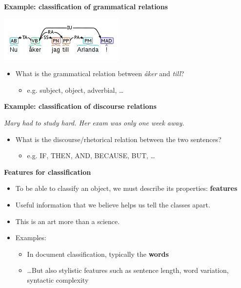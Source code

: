 \documentclass{beamer}
\newcommand{\remph}[1]{\textbf{\color{red} #1}}
\newcommand{\pagestepalt}[2]{
  \begin{frame}[t]
    \begin{minipage}[t][0.26\textheight][t]{\textwidth}
      \begin{center}
        \huge
        \textbf{#1}
      \end{center}
    \end{minipage}
    
    \begin{minipage}[t][0.7\textheight][c]{\textwidth}
      #2
    \end{minipage}
  \end{frame}
}
\begin{document}
\pagestepalt{Example: classification of grammatical relations}{

\begin{center}
\includegraphics[scale=0.5]{images/arlanda}
\end{center}\pause

\begin{itemize}
\item What is the grammatical relation between \emph{\aa{}ker} and \emph{till}?\pause
  \begin{itemize}
    \item e.g. subject, object, adverbial, \ldots
  \end{itemize}
\end{itemize}
}


\pagestepalt{Example: classification of discourse relations}{

\emph{Mary had to study hard. Her exam was only one week away.}

\pause

\begin{itemize}
  \item What is the discourse/rhetorical relation between the two sentences?\pause
  \begin{itemize}
    \item e.g. IF, THEN, AND, BECAUSE, BUT, \ldots
  \end{itemize}
\end{itemize}

}



\pagestepalt{Features for classification}{

\begin{itemize}
  \item To be able to classify an object, we must describe its properties: \remph{features}\pause
  \item Useful information that we believe helps us tell the classes apart.\pause
  \item This is an art more than a science.\pause

  \item Examples:\pause
    \begin{itemize}
      \item In document classification, typically the \remph{words}\pause
      \item \ldots But also stylistic features such as sentence
        length, word variation, syntactic complexity
    \end{itemize}

\end{itemize}

}
\end{document}
